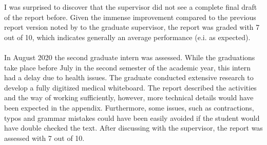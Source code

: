 I was surprised to discover that the supervisor did not see a complete final draft of the report before. 
Given the immense improvement compared to the previous report version noted by to the graduate supervisor, the report was graded with 7 out of 10, which indicates generally an average performance (e.i. as expected).
\\\\
In August 2020 the second graduate intern was assessed. While the graduations take place before July in the second semester of the academic year, this intern had a delay due to health issues. The graduate conducted extensive research to develop a fully digitized medical whiteboard.
The report described the activities and the way of working sufficiently, however, more technical details would have been expected in the appendix. 
Furthermore, some issues, such as contractions, typos and grammar mistakes could have been easily avoided if the student would have double checked the text. After discussing with the supervisor, the report was assessed with 7 out of 10.
